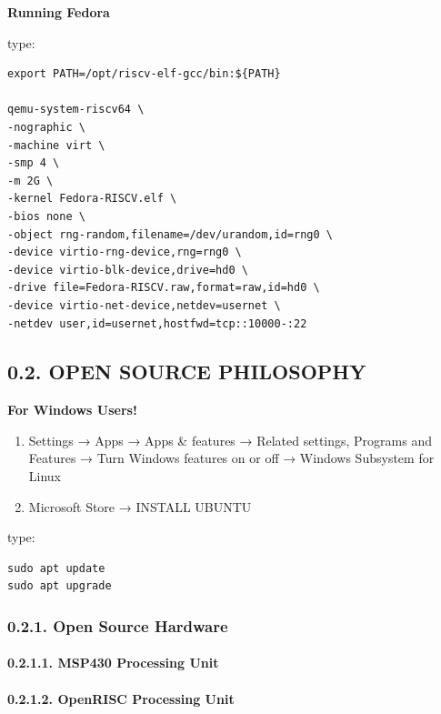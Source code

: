\documentclass[
]{article}
\begin{document}
\textbf{Running Fedora}

type:

\begin{verbatim}
export PATH=/opt/riscv-elf-gcc/bin:${PATH}

qemu-system-riscv64 \
-nographic \
-machine virt \
-smp 4 \
-m 2G \
-kernel Fedora-RISCV.elf \
-bios none \
-object rng-random,filename=/dev/urandom,id=rng0 \
-device virtio-rng-device,rng=rng0 \
-device virtio-blk-device,drive=hd0 \
-drive file=Fedora-RISCV.raw,format=raw,id=hd0 \
-device virtio-net-device,netdev=usernet \
-netdev user,id=usernet,hostfwd=tcp::10000-:22
\end{verbatim}

\hypertarget{open-source-philosophy-1}{%
\subsection{0.2. OPEN SOURCE
PHILOSOPHY}\label{open-source-philosophy-1}}

\textbf{For Windows Users!}

\begin{enumerate}
\def\labelenumi{\arabic{enumi}.}
\item
  Settings → Apps → Apps \& features → Related settings, Programs and
  Features → Turn Windows features on or off → Windows Subsystem for
  Linux
\item
  Microsoft Store → INSTALL UBUNTU
\end{enumerate}

type:

\begin{verbatim}
sudo apt update
sudo apt upgrade
\end{verbatim}

\hypertarget{open-source-hardware-1}{%
\subsubsection{0.2.1. Open Source
Hardware}\label{open-source-hardware-1}}

\hypertarget{msp430-processing-unit-1}{%
\paragraph{0.2.1.1. MSP430 Processing
Unit}\label{msp430-processing-unit-1}}

\hypertarget{openrisc-processing-unit-1}{%
\paragraph{0.2.1.2. OpenRISC Processing
Unit}\label{openrisc-processing-unit-1}}
\end{document}

